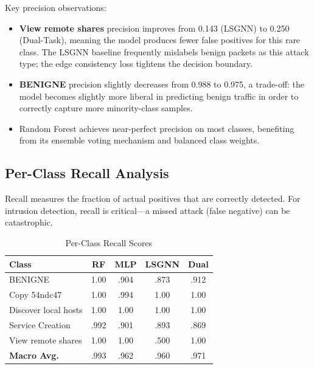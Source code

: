 \documentclass[conference]{IEEEtran}
\begin{document}
Key precision observations:
\begin{itemize}
    \item \textbf{View remote shares} precision improves from 0.143 (LSGNN) to 0.250 (Dual-Task), meaning the model produces fewer false positives for this rare class. The LSGNN baseline frequently mislabels benign packets as this attack type; the edge consistency loss tightens the decision boundary.
    \item \textbf{BENIGNE} precision slightly decreases from 0.988 to 0.975, a trade-off: the model becomes slightly more liberal in predicting benign traffic in order to correctly capture more minority-class samples.
    \item Random Forest achieves near-perfect precision on most classes, benefiting from its ensemble voting mechanism and balanced class weights.
\end{itemize}

\subsection{Per-Class Recall Analysis}

Recall measures the fraction of actual positives that are correctly detected. For intrusion detection, recall is critical---a missed attack (false negative) can be catastrophic.

\begin{table}[t]
\centering
\caption{Per-Class Recall Scores}
\label{tab:perclass_rec}
\begin{tabular}{@{}lcccc@{}}
\toprule
\textbf{Class} & \textbf{RF} & \textbf{MLP} & \textbf{LSGNN} & \textbf{Dual} \\
\midrule
BENIGNE              & 1.00 & .904 & .873 & .912 \\
Copy 54ndc47         & 1.00 & .994 & 1.00 & 1.00 \\
Discover local hosts & 1.00 & 1.00 & 1.00 & 1.00 \\
Service Creation     & .992 & .901 & .893 & .869 \\
View remote shares   & 1.00 & 1.00 & .500 & 1.00 \\
\midrule
\textbf{Macro Avg.}  & .993 & .962 & .960 & .971 \\
\bottomrule
\end{tabular}
\end{table}
\end{document}
